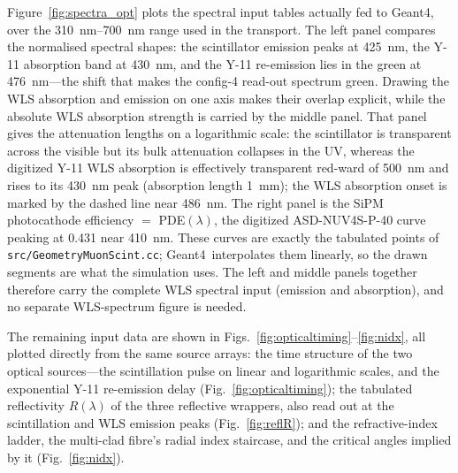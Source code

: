 \documentclass[11pt,a4paper]{article}
\newcommand{\gfour}{Geant4}
\begin{document}
Figure~\ref{fig:spectra_opt} plots the spectral input tables actually fed to
\gfour, over the \SIrange{310}{700}{\nano\meter} range used in the transport.
The left panel compares the normalised spectral shapes: the scintillator
emission peaks at \SI{425}{\nano\meter}, the Y-11 absorption band at
\SI{430}{\nano\meter}, and the Y-11 re-emission lies in the green at
\SI{476}{\nano\meter}---the shift that makes the config-4 read-out spectrum
green. Drawing the WLS absorption and emission on one axis makes their overlap
explicit, while the absolute WLS absorption strength is carried by the middle
panel. That panel gives the attenuation lengths on a logarithmic scale: the
scintillator is transparent across the visible but its bulk attenuation
collapses in the UV, whereas the digitized Y-11 WLS absorption is effectively
transparent red-ward of \SI{500}{\nano\meter} and rises to its
\SI{430}{\nano\meter} peak (absorption length \SI{1}{\milli\meter}); the WLS
absorption onset is marked by the dashed line near \SI{486}{\nano\meter}. The
right panel is the SiPM photocathode efficiency $=$ PDE$(\lambda)$, the digitized
ASD-NUV4S-P-40 curve peaking at \num{0.431} near \SI{410}{\nano\meter}. These
curves are exactly the tabulated points of \texttt{src/GeometryMuonScint.cc};
\gfour\ interpolates them linearly, so the drawn segments are what the simulation
uses. The left and middle panels together therefore carry the complete WLS
spectral input (emission and absorption), and no separate WLS-spectrum figure
is needed.

The remaining input data are shown in
Figs.~\ref{fig:opticaltiming}--\ref{fig:nidx}, all plotted directly from the
same source arrays: the time structure of the two optical sources---the
scintillation pulse on linear and logarithmic scales, and the exponential Y-11
re-emission delay (Fig.~\ref{fig:opticaltiming}); the tabulated reflectivity
$R(\lambda)$ of the three reflective wrappers, also read out at the
scintillation and WLS emission peaks (Fig.~\ref{fig:reflR}); and the
refractive-index ladder, the multi-clad fibre's radial index staircase, and the
critical angles implied by it (Fig.~\ref{fig:nidx}).
\end{document}
